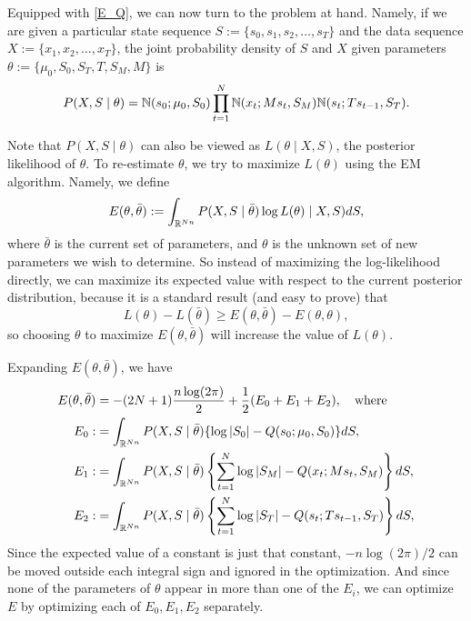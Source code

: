 \documentclass[12pt,leqno]{article}
\begin{document}
Equipped with \eqref{E_Q}, we can now turn to the problem at hand.  Namely, if we are given a particular
state sequence $S := \{s_0,s_1,s_2,\dots,s_T\}$ and the data sequence $X := \{x_1,x_2,\dots,x_T\}$,
the joint probability density of $S$ and $X$ given parameters $\theta := \{\mu_0,S_0,S_T,T,S_M,M\}$ is
$$
P(X,S\mid\theta) = {\mathbb N}(s_0;\mu_0,S_0)\prod_{t=1}^N{\mathbb N}(x_t;Ms_t,S_M){\mathbb N}(s_t;Ts_{t-1},S_T).
$$

Note that $P(X,S\mid\theta)$ can also be viewed as  $L(\theta\mid X,S)$, the posterior likelihood of $\theta$.
To re-estimate $\theta$, we try to maximize $L(\theta)$ using the EM algorithm. Namely, we define 
$$
E(\theta,\bar{\theta}) := \int_{{\mathbb R}^{Nn}}P(X,S\mid\bar{\theta})\log{L(\theta)\mid X,S)}dS,
$$
where $\bar{\theta}$ is the current set of parameters, and $\theta$ is the unknown set of new parameters
we wish to determine. So instead of maximizing the log-likelihood directly, we can maximize its expected
value with respect to the current posterior distribution, because it is a standard result \cite{Dempster}
(and easy to prove) that
$$
L(\theta) - L(\bar{\theta}) \ge E(\theta,\bar{\theta}) - E(\theta,\theta),
$$
so choosing $\theta$ to maximize $E(\theta,\bar{\theta})$ will increase the value of $L(\theta)$.


  
Expanding $E(\theta,\bar{\theta})$, we have 
\begin{align}
  E(\theta,\bar{\theta}) &= -(2N+1)\frac{n\log(2\pi)}{2} + \frac{1}{2}(E_0 + E_1 + E_2),\quad\text{where}\notag\\
  E_0 :&=\int_{{\mathbb R}^{Nn}}P(X,S\mid\bar{\theta})\{\log|S_0| - Q(s_0;\mu_0,S_0)\}dS,\label{E0}\\
  E_1 :&= \int_{{\mathbb R}^{Nn}}P(X,S\mid\bar{\theta})\left\{\sum_{t=1}^N\log|S_M| - Q(x_t;Ms_t,S_M)\right\}dS,
\label{E1}\\
E_2 :&= \int_{{\mathbb R}^{Nn}}P(X,S\mid\bar{\theta})\left\{\sum_{t=1}^N\log|S_T| - Q(s_t;Ts_{t-1},S_T)\right\}dS,
\label{E2}
\end{align}
Since the expected value of a constant is just that constant, $-n\log(2\pi)/2$ can be moved outside each
integral sign and ignored in the optimization.  And since none of the parameters of $\theta$ appear in more
than one of the $E_i$, we can optimize $E$ by optimizing each of $E_0,E_1,E_2$ separately.
\end{document}

